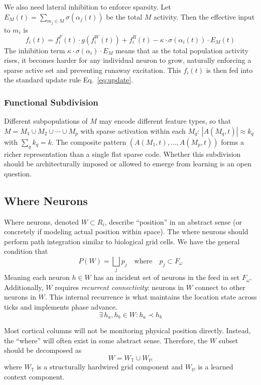\documentclass[11pt]{article}
\begin{document}
We also need lateral inhibition to enforce sparsity. Let $E_M(t) = \sum_{m_j \in M} \sigma(\alpha_j(t))$ be the total $M$ activity. Then the effective input to $m_i$ is
\begin{equation}\label{eq:m_input}
    f_i(t) = f_i^F(t) \cdot g(f_i^W(t)) + f_i^R(t) - \kappa \cdot \sigma(\alpha_i(t)) \cdot E_M(t)
\end{equation}
The inhibition term $\kappa \cdot \sigma(\alpha_i) \cdot E_M$ means that as the total population activity rises, it becomes harder for any individual neuron to grow, naturally enforcing a sparse active set and preventing runaway excitation. This $f_i(t)$ is then fed into the standard update rule Eq.~\eqref{eq:update}.

\subsubsection{Functional Subdivision}
Different subpopulations of $M$ may encode different feature types, so that $M = M_1 \cup M_2 \cup \cdots \cup M_p$ with sparse activation within each $M_q$: $|A(M_q, t)| \approx k_q$ with $\sum_q k_q = k$. The composite pattern $(A(M_1, t), \ldots, A(M_p, t))$ forms a richer representation than a single flat sparse code. Whether this subdivision should be architecturally imposed or allowed to emerge from learning is an open question.

\subsection{Where Neurons}
Where neurons, denoted $W \subset R_i$, describe ``position'' in an abstract sense (or concretely if modeling actual position within space). The where neurons should perform path integration similar to biological grid cells. We have the general condition that
\begin{equation}
    P(W) = \bigsqcup_j p_j \quad \text{where} \quad p_j \subset F_\omega
\end{equation}
Meaning each neuron $h \in W$ has an incident set of neurons in the feed in set $F_\omega$. Additionally, $W$ requires \textit{recurrent connectivity}: neurons in $W$ connect to other neurons in $W$. This internal recurrence is what maintains the location state across ticks and implements phase advance.
\begin{equation}
    \exists\, h_a, h_b \in W : h_a \prec h_b
\end{equation}

Most cortical columns will not be monitoring physical position directly. Instead, the ``where'' will often exist in some abstract sense. Therefore, the $W$ subset should be decomposed as
\begin{equation}
    W = W_\mathbb{T} \cup W_\mathbb{M}
\end{equation}
where $W_\mathbb{T}$ is a structurally hardwired grid component and $W_\mathbb{M}$ is a learned context component.
\end{document}
